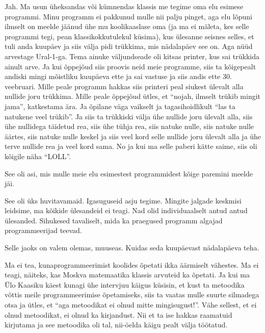 Jah. Ma usun üheksandas või kümnendas klassis me tegime oma elu esimese programmi. Minu  programm ei pakkunud mulle nii palju pinget, aga elu lõpuni ilmselt on meelde jäänud ühe mu koolikaaslase oma (ja ma ei mäleta, kes selle programmi tegi, pean klassikokkutulekul küsima), kus ülesanne seisnes selles, et tuli anda kuupäev ja siis  välja pidi trükkima, mis nädalapäev see on. Aga nüüd arvestage Ural-1-ga. Tema ainuke väljundseade oli kitsas printer, kus sai trükkida ainult arve. Ja kui õppejõud siis proovis neid meie programme, siis ta kõigepealt andiski mingi mõistliku kuupäeva ette ja sai vastuse ja siis andis ette 30. veebruari. Mille peale programm hakkas siis printeri peal siukest ülevalt alla nullide joru trükkima. Mille peale õppejõud ütles, et \enquote{nojah, ilmselt trükib mingit jama}, katkestama ära. Ja õpilane väga vaikselt ja tagasihoidlikult \enquote{las ta natukene veel trükib}. Ja siis ta trükkiski välja ühe nullide joru ülevalt alla, siis ühe nullidega täidetud rea, siis ühe tühja rea, siis natuke nulle, siis natuke nulle äärtes, siis natuke nulle keskel ja siis veel kord selle nullide joru ülevalt alla ja ühe terve nullide rea ja veel kord sama. No ja kui ma selle paberi kätte saime, siis oli kõigile näha \enquote{LOLL}. 

See oli asi, mis mulle meie elu esimestest programmidest kõige paremini meelde jäi. 


See oli üks huvitavamaid. Igasuguseid asju tegime. Mingite jalgade keskmisi leidsime, ma kõikide ülesandeid ei teagi. Nad olid individuaalselt antud antud ülesanded. Sihukesed tavaliselt, mida ka praegused programm algajad programmeerijad teevad.

Selle jaoks on valem olemas, muuseas. Kuidas seda kuupäevast nädalapäeva teha. 


Ma ei tea, kunaprogrammeerimist koolides õpetati ikka äärmiselt vähestes. Ma ei teagi, näiteks, kas Moskva matemaatika klassis arvuteid ka õpetati. Ja kui ma Ülo Kaasiku käest kunagi ühe intervjuu käigus küsisin, et  kust ta metoodika võttis meile programmeerimise õpetamiseks, siis ta vaatas mulle suurte silmadega otsa ja ütles, et \enquote{aga metoodikat ei olnud mitte mingisugust!}. Vähe sellest, et ei olnud metoodikat, ei olnud ka kirjandust. Nii et ta ise hakkas  raamatuid kirjutama ja see metoodika oli tal, nii-öelda käigu pealt välja töötatud.

